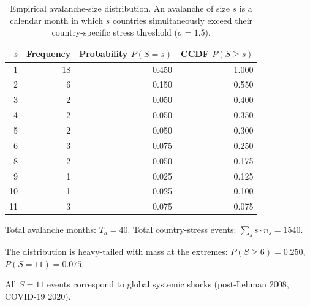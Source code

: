 \begin{table}[!htbp]
\centering
\footnotesize
\begin{threeparttable}
\caption{Empirical avalanche-size distribution. An avalanche of size $s$ is a calendar month in which $s$ countries simultaneously exceed their country-specific stress threshold ($\sigma=1.5$).}
\label{tab:avalanche_distribution}
\begin{tabular}{rrrr}
\toprule
$s$ & Frequency & Probability $P(S=s)$ & CCDF $P(S \geq s)$ \\
\midrule
1 & 18 & 0.450 & 1.000 \\
2 & 6 & 0.150 & 0.550 \\
3 & 2 & 0.050 & 0.400 \\
4 & 2 & 0.050 & 0.350 \\
5 & 2 & 0.050 & 0.300 \\
6 & 3 & 0.075 & 0.250 \\
8 & 2 & 0.050 & 0.175 \\
9 & 1 & 0.025 & 0.125 \\
10 & 1 & 0.025 & 0.100 \\
11 & 3 & 0.075 & 0.075 \\
\bottomrule
\end{tabular}
\begin{tablenotes}\footnotesize
\item Total avalanche months: $T_a=40$. Total country-stress events: $\sum_s s\cdot n_s=1540$.
\item The distribution is heavy-tailed with mass at the extremes: $P(S\geq 6)=0.250$, $P(S=11)=0.075$.
\item All $S=11$ events correspond to global systemic shocks (post-Lehman 2008, COVID-19 2020).
\end{tablenotes}
\end{threeparttable}
\end{table}
